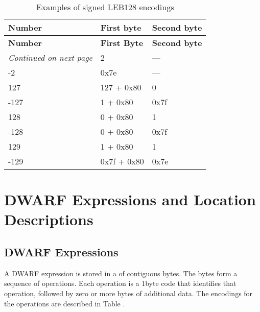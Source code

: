 \begin{centering}
\setlength{\extrarowheight}{0.1cm}
\begin{longtable}{l|l|l}
  \caption{Examples of signed LEB128 encodings} \label{tab:examplesofsignedleb128encodings} \\
  \hline \bfseries Number&\bfseries First byte &\bfseries Second byte \\ \hline
\endfirsthead
  \bfseries Number&\bfseries First Byte &\bfseries Second byte\\ \hline
\endhead
  \hline \emph{Continued on next page}
\endfoot
  \hline
\endlastfoot
2&2& --- \\
-2&0x7e& ---\\
127& 127 + 0x80 & 0 \\
-127& 1 + 0x80 & 0x7f \\
128& 0 + 0x80 & 1 \\
-128& 0 + 0x80 & 0x7f \\
129& 1 + 0x80 & 1 \\
-129& 0x7f + 0x80 & 0x7e \\

\end{longtable}
\end{centering}



\section{DWARF Expressions and Location Descriptions}
\label{datarep:dwarfexpressionsandlocationdescriptions}
\subsection{DWARF Expressions}
\label{datarep:dwarfexpressions}

A 
DWARF expression is stored in a  of contiguous
bytes. The bytes form a sequence of operations. Each operation
is a 1\dash byte code that identifies that operation, followed by
zero or more bytes of additional data. The encodings for the
operations are described in 
Table . 

